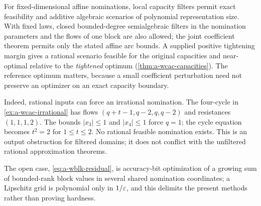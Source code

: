 For fixed-dimensional affine nominations, local capacity filters permit
exact feasibility and additive algebraic scenarios of polynomial
representation size. With fixed laws, closed bounded-degree
semialgebraic filters in the nomination parameters and the flows of one
block are also allowed; the joint coefficient theorem permits only the
stated affine arc bounds. A supplied positive tightening margin gives a
rational scenario feasible for the original capacities and near-optimal
relative to the \emph{tightened} optimum (\cref{thm:a-wcac-capacities}).
The reference optimum matters, because a small coefficient perturbation
need not preserve an optimizer on an exact capacity boundary.

Indeed, rational inputs can force an irrational nomination. The four-cycle
in \cref{ex:a-wcac-irrational} has flows
$(q+t-1,q-2,q,q-2)$ and resistances $(1,1,1,2)$.
The bounds $|x_3|\le1$ and $|x_4|\le1$ force $q=1$; the
cycle equation becomes $t^2=2$ for $1\le t\le2$.
No rational feasible nomination exists. This is an output obstruction
for filtered domains; it does not conflict with the unfiltered rational
approximation theorems.

The open case, \cref{eq:a-wblk-residual}, is accuracy-bit optimization
of a growing sum of bounded-rank block values in several shared
nomination coordinates; a Lipschitz grid is polynomial only in
$1/\varepsilon$, and this delimits the present methods rather than proving
hardness.
